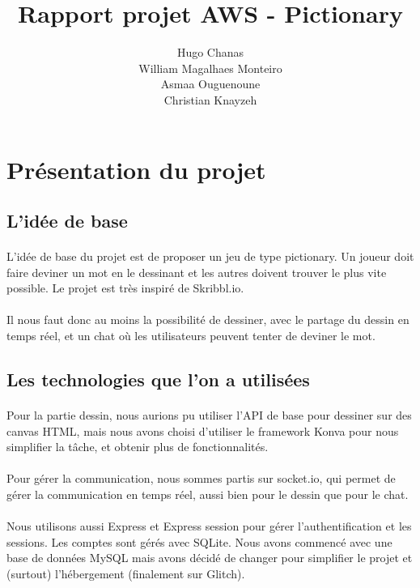 \documentclass[11pt,a4paper]{article}
\date{}
\title{Rapport projet AWS - Pictionary}
\author{ Hugo Chanas \\ William Magalhaes Monteiro \\ Asmaa Ouguenoune \\ Christian Knayzeh }
\begin{document}
    \maketitle
    \section{Présentation du projet}
        \subsection{L'idée de base}
            \paragraph{}
            L'idée de base du projet est de proposer un jeu de type pictionary.
            Un joueur doit faire deviner un mot en le dessinant et les autres doivent trouver le plus vite possible.
            Le projet est très inspiré de Skribbl.io.
            \paragraph{}
            Il nous faut donc au moins la possibilité de dessiner, avec le partage du dessin en temps réel,
            et un chat où les utilisateurs peuvent tenter de deviner le mot.
        \subsection{Les technologies que l'on a utilisées}
            \paragraph{}
            Pour la partie dessin, nous aurions pu utiliser l'API de base pour dessiner sur des canvas HTML,
            mais nous avons choisi d'utiliser le framework Konva pour nous simplifier la tâche, et obtenir plus de fonctionnalités.
            \paragraph{}
            Pour gérer la communication, nous sommes partis sur socket.io, qui permet de gérer la communication en temps réel,
            aussi bien pour le dessin que pour le chat.
            \paragraph{}
            Nous utilisons aussi Express et Express session pour gérer l'authentification et les sessions.
            Les comptes sont gérés avec SQLite.
            Nous avons commencé avec une base de données MySQL mais avons décidé de changer pour simplifier le projet et (surtout) l'hébergement (finalement sur Glitch).
\end{document}
